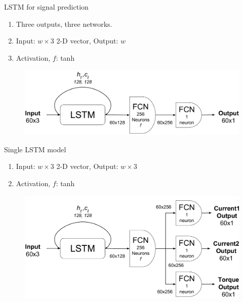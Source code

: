 \documentclass[handout]{beamer}
\begin{document}
\begin{frame}{LSTM for signal prediction}
  \begin{enumerate}
    \item Three outputs, three networks.
    \item Input: $w\times3$ 2-D vector, Output: $w$
    \item Activation, $f$: tanh
  \end{enumerate}
  \begin{center}
    \begin{figure}
    \includegraphics[scale=0.35]{images/motor_lstm}
    \end{figure}
  \end{center}
\end{frame}

\begin{frame}{Single LSTM model}
\begin{enumerate}
  \item Input: $w\times3$ 2-D vector, Output: $w\times3$
  \item Activation, $f$: tanh
\end{enumerate}
\begin{center}
  \begin{figure}
  \includegraphics[scale=0.35]{images/motor_comb_lstm}
  \end{figure}
\end{center}
\end{frame}
\end{document}

